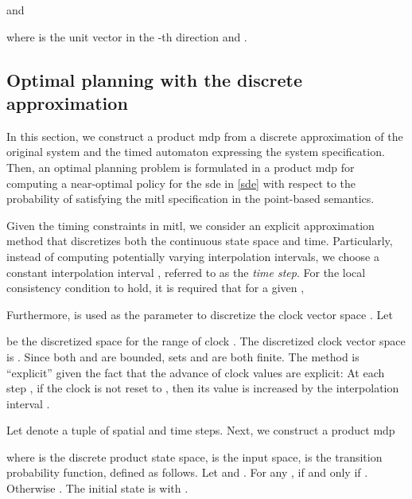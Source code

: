 \documentclass[letterpaper, 10 pt, conference]{ieeeconf}
\begin{document}
and

where  is the unit vector in the -th direction and
.





\subsection{Optimal planning with the discrete approximation}
In this section, we construct a product \ac{mdp} from a discrete
approximation of the original system and the timed automaton
expressing the system specification.  Then, an optimal planning
problem is formulated in a product \ac{mdp} for computing a
near-optimal policy for the \ac{sde} in \eqref{sde} with respect to
the probability of satisfying the \ac{mitl} specification in the
point-based semantics.  






Given the timing constraints in \ac{mitl}, we consider an explicit
approximation method that discretizes both the continuous state space
and time. Particularly, instead of computing potentially varying
interpolation intervals, we choose a constant interpolation interval
, referred to as the \emph{time step}. For the local
consistency condition to hold, it is required that for a given
, 

Furthermore,  is used as the parameter to discretize the clock
vector space . Let

be the discretized space for the range  of clock .
The discretized clock vector space is
.  Since both 
and  are bounded, sets  and  are both
finite.  The method is ``explicit'' given the fact that the advance of
clock values are explicit: At each step , if the clock is not reset
to , then its value is increased by the interpolation interval
. 

 


Let  denote a tuple of spatial and time steps. Next, we
construct a product \ac{mdp}

where  is the discrete product
state space,  is the input space,
 is the transition
probability function, defined as follows. Let  and
. For any ,  if and
only if . Otherwise
. The initial state is  with
.
\end{document}
